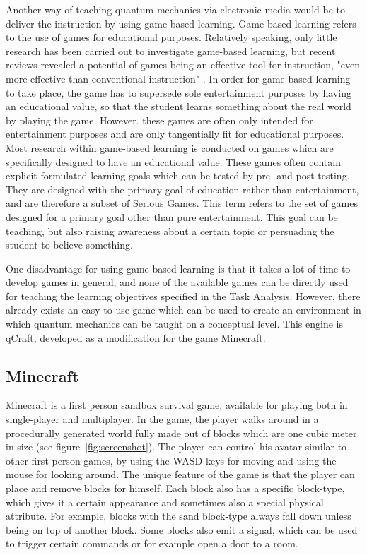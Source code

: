\documentclass[11pt,twoside]{report} %
\begin{document}
Another way of teaching quantum mechanics via electronic media would be to deliver the instruction by using game-based learning. Game-based learning refers to the use of games for educational purposes. Relatively speaking, only little research has been carried out to investigate game-based learning, but recent reviews revealed a potential of games being an effective tool for instruction, "even more effective than conventional instruction" \cite[p.~1]{wouters}. In order for game-based learning to take place, the game has to supersede sole entertainment purposes by having an educational value, so that the student learns something about the real world by playing the game. However. these games are often only intended for entertainment purposes and are only tangentially fit for educational purposes. Most research within game-based learning is conducted on games which are specifically designed to have an educational value. These games often contain explicit formulated learning goals which can be tested by pre- and post-testing. They are designed with the primary goal of education rather than entertainment, and are therefore a subset of Serious Games. This term refers to the set of games designed for a primary goal other than pure entertainment. This goal can be teaching, but also raising awareness about a certain topic or persuading the student to believe something.

One disadvantage for using game-based learning is that it takes a lot of time to develop games in general, and none of the available games can be directly used for teaching the learning objectives specified in the Task Analysis. However, there already exists an easy to use game which can be used to create an environment in which quantum mechanics can be taught on a conceptual level. This engine is qCraft, developed as a modification for the game Minecraft.

\subsection{Minecraft}

Minecraft is a first person sandbox survival game, available for playing both in single-player and multiplayer. In the game, the player walks around in a procedurally generated world fully made out of blocks which are one cubic meter in size (see figure~\ref{fig:screenshot}). The player can control his avatar similar to other first person games, by using the WASD keys for moving and using the mouse for looking around. The unique feature of the game is that the player can place and remove blocks for himself. Each block also has a specific block-type, which gives it a certain appearance and sometimes also a special physical attribute. For example, blocks with the sand block-type always fall down unless being on top of another block. Some blocks also emit a signal, which can be used to trigger certain commands or for example open a door to a room.
\end{document}
